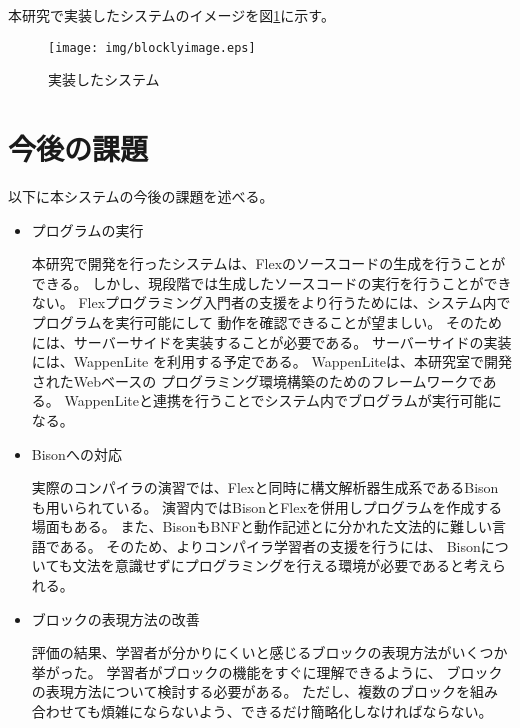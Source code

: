 \documentclass{risepaper}
\begin{document}
本研究で実装したシステムのイメージを図\ref{fig:blocklyimage}に示す。

\begin{figure}[h]
\begin{center}
\texttt{[image: img/blocklyimage.eps]}
\end{center}%
\caption{実装したシステム}%
\label{fig:blocklyimage}
\end{figure}%


\section{今後の課題}

以下に本システムの今後の課題を述べる。

\begin{itemize}
\item プログラムの実行

本研究で開発を行ったシステムは、Flexのソースコードの生成を行うことができる。
しかし、現段階では生成したソースコードの実行を行うことができない。
Flexプログラミング入門者の支援をより行うためには、システム内でプログラムを実行可能にして
動作を確認できることが望ましい。
そのためには、サーバーサイドを実装することが必要である。
サーバーサイドの実装には、WappenLite \cite{Thesis07}を利用する予定である。
WappenLiteは、本研究室で開発されたWebベースの
プログラミング環境構築のためのフレームワークである。
WappenLiteと連携を行うことでシステム内でブログラムが実行可能になる。

\end{itemize}

\begin{itemize}
\item Bisonへの対応

実際のコンパイラの演習では、Flexと同時に構文解析器生成系であるBisonも用いられている。
演習内ではBisonとFlexを併用しプログラムを作成する場面もある。
また、BisonもBNFと動作記述とに分かれた文法的に難しい言語である。
そのため、よりコンパイラ学習者の支援を行うには、
Bisonについても文法を意識せずにプログラミングを行える環境が必要であると考えられる。

\end{itemize}

\begin{itemize}
\item ブロックの表現方法の改善

評価の結果、学習者が分かりにくいと感じるブロックの表現方法がいくつか挙がった。
学習者がブロックの機能をすぐに理解できるように、
ブロックの表現方法について検討する必要がある。
ただし、複数のブロックを組み合わせても煩雑にならないよう、できるだけ簡略化しなければならない。

\end{itemize}
\end{document}
